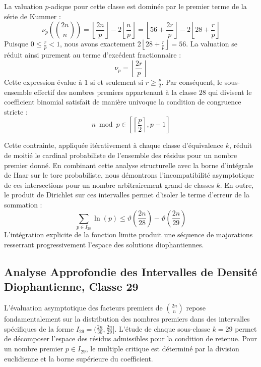 \documentclass[12pt,a4paper]{article}
\begin{document}
    La valuation $p$-adique pour cette classe est dominée par le premier terme de la série de Kummer :
    \begin{equation}
    \nu_p\left( \binom{2n}{n} \right) = \left\lfloor \frac{2n}{p} \right\rfloor - 2 \left\lfloor \frac{n}{p} \right\rfloor = \left\lfloor 56 + \frac{2r}{p} \right\rfloor - 2 \left\lfloor 28 + \frac{r}{p} \right\rfloor
    \end{equation}
    Puisque $0 \le \frac{r}{p} < 1$, nous avons exactement $2 \left\lfloor 28 + \frac{r}{p} \right\rfloor = 56$.
    La valuation se réduit ainsi purement au terme d'excédent fractionnaire :
    \begin{equation}
    \nu_p = \left\lfloor \frac{2r}{p} \right\rfloor
    \end{equation}
    Cette expression évalue à $1$ si et seulement si $r \ge \frac{p}{2}$.
    Par conséquent, le sous-ensemble effectif des nombres premiers appartenant à la classe $28$ qui divisent le coefficient binomial satisfait de manière univoque la condition de congruence stricte :
    \begin{equation}
    n \bmod p \in \left[ \left\lceil \frac{p}{2} \right\rceil, p - 1 \right]
    \end{equation}

    Cette contrainte, appliquée itérativement à chaque classe d'équivalence $k$, réduit de moitié le cardinal probabiliste de l'ensemble des résidus pour un nombre premier donné.
    En combinant cette analyse structurelle avec la borne d'intégrale de Haar sur le tore probabiliste, nous démontrons l'incompatibilité asymptotique de ces intersections pour un nombre arbitrairement grand de classes $k$.
    En outre, le produit de Dirichlet sur ces intervalles permet d'isoler le terme d'erreur de la sommation :
    \begin{equation}
    \sum_{p \in I_28} \ln(p) \le \vartheta\left(\frac{2n}{28}\right) - \vartheta\left(\frac{2n}{29}\right)
    \end{equation}
    L'intégration explicite de la fonction limite produit une séquence de majorations resserrant progressivement l'espace des solutions diophantiennes.
    
    \newpage
    \subsection{Analyse Approfondie des Intervalles de Densité Diophantienne, Classe 29}
    L'évaluation asymptotique des facteurs premiers de $\binom{2n}{n}$ repose fondamentalement sur la distribution des nombres premiers dans des intervalles spécifiques de la forme $I_29 = (\frac{2n}{30}, \frac{2n}{29}]$.
    L'étude de chaque sous-classe $k = 29$ permet de décomposer l'espace des résidus admissibles pour la condition de retenue.
    Pour un nombre premier $p \in I_29$, le multiple critique est déterminé par la division euclidienne et la borne supérieure du coefficient.
\end{document}
